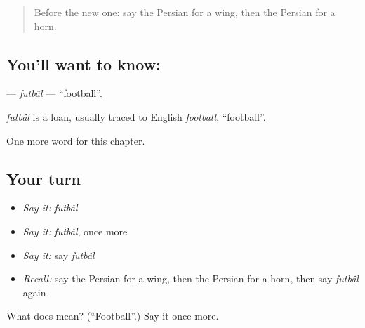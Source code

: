 \begin{quote}
Before the new one: say the Persian for a wing, then the Persian for a horn.
\end{quote}

\subsection*{You'll want to know: }
\textbf{} — \emph{futbâl} — \textquotedblleft{}football\textquotedblright{}.

\begin{cousinweb}
\emph{futbâl} is a loan, usually traced to English \emph{football}, \textquotedblleft{}football\textquotedblright{}.
\end{cousinweb}

\begin{grammarlens}[title={What you've built}]
One more word for this chapter.
\end{grammarlens}

\subsection*{Your turn}
\begin{itemize}
\raggedright
  \item \emph{Say it:} \emph{futbâl}
  \item \emph{Say it:} \emph{futbâl}, once more
  \item \emph{Say it:} say \emph{futbâl}
  \item \emph{Recall:} say the Persian for a wing, then the Persian for a horn, then say \emph{futbâl} again
\end{itemize}

\begin{tcolorbox}[breakable,colback=teal!4,colframe=teal!35!black,title={Before you move on}]
What does  mean? (\textquotedblleft{}Football\textquotedblright{}.) Say it once more.
\end{tcolorbox}

